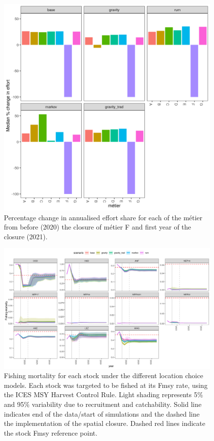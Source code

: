 \documentclass[12pt, halfline, a4paper]{ouparticle}
\begin{document}
\begin{figure}[!ht]
	\centering
	\includegraphics[width=1\linewidth]{figures/Change_effort}
	\caption{Percentage change in annualised effort share for each of the
		métier from before (2020) the closure of métier F and first
		year of the closure (2021).} 
	\label{fig:effort_chg}
\end{figure}	

\begin{figure}[!ht]
	\centering
	\includegraphics[width=1\linewidth]{figures/F_difference}
	\caption{Fishing mortality for each stock under the different location
		choice models. Each stock was targeted to be fished at its Fmsy
		rate, using the ICES MSY Harvest Control Rule. Light shading
		represents 5\% and 95\% variability due to recruitment and
		catchability. Solid line indicates end of the data/start of
		simulations and the dashed line the implementation of the
		spatial closure. Dashed red lines indicate the stock Fmsy
		reference point.} 
	\label{fig:F}
\end{figure}	
\end{document}
